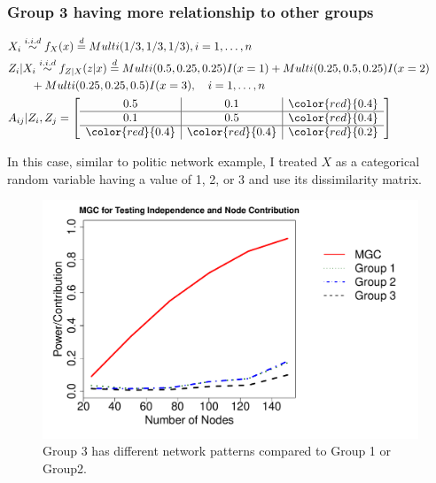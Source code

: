 \documentclass[12pt]{article}
\begin{document}
\subsubsection*{Group 3 having more relationship to other groups}
\begin{equation}
\label{eq:sim2}
\begin{gathered}
\begin{aligned}
&  X_{i} \overset{i.i.d}{\sim} f_{X}(x)   \stackrel{d}{=}  Multi(1/3, 1/3, 1/3), i = 1, \ldots , n \\ 
&  Z_{i} | X_{i}  \overset{i.i.d}{\sim}    f_{Z|X}(z|x)  \stackrel{d}{=}   Multi(0.5, 0.25, 0.25) I( x = 1 ) +   Multi(0.25, 0.5, 0.25) I (x = 2)  \qquad  \\ & \quad \quad + Multi(0.25, 0.25, 0.5)I(x = 3), \quad  i = 1,\ldots,n  \\
&  A_{ij} | Z_{i}, Z_{j}   = \left[ \begin{array}{c|c|c} 0.5 & 0.1 & \color{red}{0.4} \\ \hline 0.1 & 0.5 & \color{red}{0.4} \\ \hline \color{red}{0.4} & \color{red}{0.4} & \color{red}{0.2}   \end{array} \right]
\end{aligned}
\end{gathered}
\end{equation}

In this case, similar to politic network example, I treated $X$ as a categorical random variable having a value of 1, 2, or 3 and use its dissimilarity matrix.

\begin{figure}[h]
	\centering
	\includegraphics[width=\linewidth]{../../Figure/revcontri.pdf}	
	\caption{Group 3 has different network patterns compared to Group 1 or Group2.}
	\label{fig:revcontri}
\end{figure}
\end{document}
